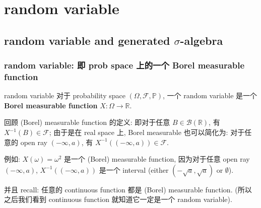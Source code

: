 \chapter{random variable}
\section{random variable and generated $\sigma$-algebra}
\subsection{random variable: 即 prob space 上的一个 Borel measurable function}
\begin{definition}{random variable}
    对于 probability space \((\Omega, \mathcal{F}, \mathbb{P})\), 一个 random variable 是一个 \textbf{Borel measurable function} $X: \Omega \rightarrow \mathbb{R}$.
\end{definition}

\begin{remark}

    回顾 (Borel) measurable function 的定义: 
    即对于任意 $B \in \mathcal{B}(\mathbb{R})$, 有 $X^{-1}(B) \in \mathcal{F}$; 
    由于是在 real space 上, Borel measurable 也可以简化为: 
    对于任意的 open ray \((-\infty, a)\), 有 
    \(X^{-1}((-\infty,a)) \in \mathcal{F}\). 

    例如: \(X(\omega) = \omega^2\) 是一个 (Borel) measurable function, 
    因为对于任意 open ray \((-\infty, a)\),
     \(X^{-1}((-\infty,a))\) 是一个
      interval (either \((-\sqrt{a}, \sqrt{a})\) 
      or \(\emptyset\)). 

    并且 recall: 任意的 continuous function 都是 (Borel) measurable function.
    (所以之后我们看到 continuous function 就知道它一定是一个 random variable).

\end{remark}

